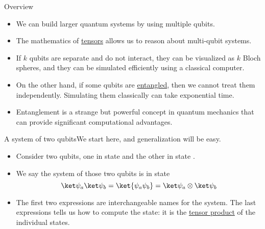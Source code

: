 
\begin{frame}{Overview}

\begin{itemize}
    \item We can build larger quantum systems by using multiple qubits.
    \item The mathematics of \href{https://en.wikipedia.org/wiki/Tensor}{tensors} allows us to reason about multi-qubit systems.
    \item If $k$ qubits are separate and do not interact, they can be visualized as $k$ Bloch spheres, and they can be simulated efficiently using a classical computer.
    \item On the other hand, if some qubits are \href{https://en.wikipedia.org/wiki/Quantum_entanglement}{entangled}, then we cannot treat them independently.  Simulating them classically can take exponential time.
    \item Entanglement is a strange but powerful concept in quantum mechanics that can provide significant computational advantages.
\end{itemize}
    
\end{frame}

\begin{frame}{A system of two qubits}{We start here, and generalization will be easy.}
\begin{itemize}
    \item Consider two qubits, one in state  and the other in state .
    \item We say the system of those two qubits is in state
    \[
       \QState{a}\QState{b} = \ket{\psi_{a}\psi_{b}} = \TensProd{\QState{a}}{\QState{b}}
    \]
    \item The first two expressions are interchangeable names for the system. The last expressions tells us how to compute the state:  it is the \href{https://en.wikipedia.org/wiki/Tensor_product}{tensor product} of the individual states.
\end{itemize}
\end{frame}



